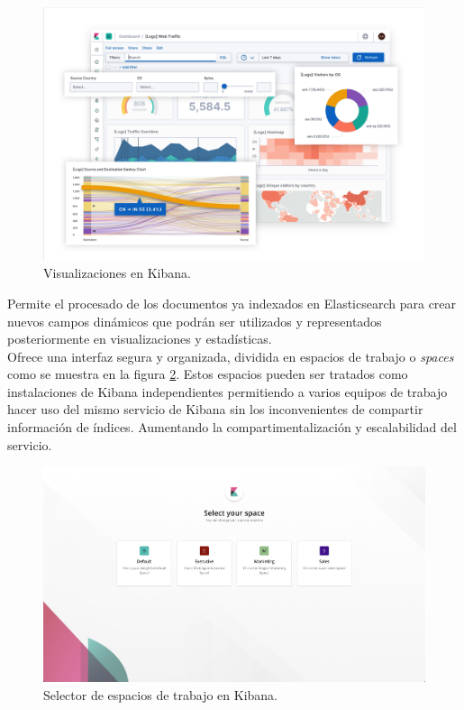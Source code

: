 \documentclass[a4paper, 12pt]{book}
\begin{document}
		\begin{figure}[H]
			\centering
			\includegraphics[width=12cm, keepaspectratio]{img/visualizations_kibana.png}
			\caption{Visualizaciones en Kibana.}
			\label{fig:visualizations_kibana}
		\end{figure}
		
		Permite el procesado de los documentos ya indexados en Elasticsearch para crear nuevos campos dinámicos que podrán ser utilizados y representados posteriormente en visualizaciones y estadísticas.\\
		
		Ofrece una interfaz segura y organizada, dividida en espacios de trabajo o \textit{spaces} como se muestra en la figura \ref{fig:spaces_kibana}. Estos espacios pueden ser tratados como instalaciones de Kibana independientes permitiendo a varios equipos de trabajo hacer uso del mismo servicio de Kibana sin los inconvenientes de compartir información de índices. Aumentando la compartimentalización y escalabilidad del servicio.
		
		
		\begin{figure}[H]
			\centering
			\includegraphics[width=12cm, keepaspectratio]{img/spaces_kibana.jpg}
			\caption{Selector de espacios de trabajo en Kibana.}
			\label{fig:spaces_kibana}
		\end{figure}
		
\end{document}
